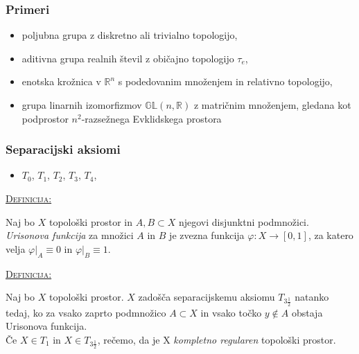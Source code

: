 \documentclass[a4paper, 12pt]{beamer}
\newenvironment{matematika}[1]{
\textcolor{bostonuniversityred}{\underline{\textsc{#1:}}}
}{
}
\begin{document}
\begin{frame}
\frametitle{Primeri}
\begin{itemize}[label=]
\item<1-> poljubna grupa z diskretno ali trivialno topologijo,
\item<2-> aditivna grupa realnih števil z običajno topologijo $\tau_e$,
\item<3-> enotska krožnica v $\mathbb{R}^n$ s podedovanim množenjem in relativno topologijo,
\item<4-> grupa linarnih izomorfizmov $\mathbb{GL}(n,\mathbb{R})$ z matričnim množenjem, gledana kot podprostor $n^2$-razsežnega Evklidskega prostora
\end{itemize}
\end{frame}

\begin{frame}
\frametitle{Separacijski aksiomi}
\begin{itemize}[label=]
\item $T_0$, $T_1$, $T_2$, $T_3$, $T_4$,
\end{itemize}

\pause

\begin{matematika}{Definicija}
Naj bo $X$ topološki prostor in $A,B \subset X$ njegovi disjunktni podmnožici. \emph{Urisonova funkcija} za množici $A$ in $B$ je zvezna funkcija $\varphi : X \to [0,1]$, za katero velja $\varphi |_A \equiv 0$ in $\varphi |_B \equiv 1$.
\end{matematika}
\newline

\pause

\begin{matematika}{Definicija}
Naj bo $X$ topološki prostor. $X$ zadošča separacijskemu aksiomu $T_{3 \frac{1}{2}}$ natanko tedaj, ko za vsako zaprto podmnožico $A \subset X$ in vsako točko $y \notin A$ obstaja Urisonova funkcija. \\
Če $X \in T_1$ in $X \in T_{3 \frac{1}{2}}$, rečemo, da je X \emph{kompletno regularen} topološki prostor.
\end{matematika}

\end{frame}
\end{document}
